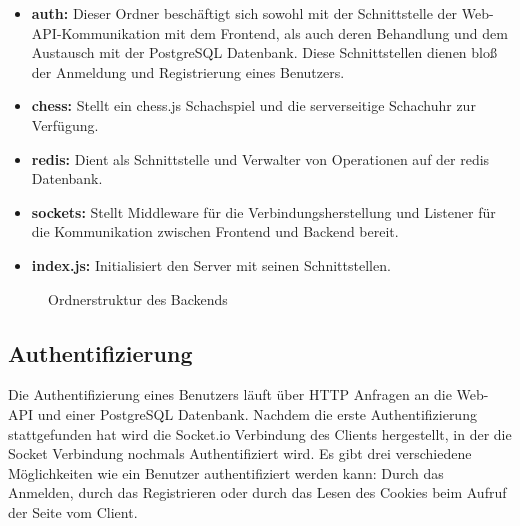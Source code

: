 \begin{itemize}
\item \textbf{auth:} Dieser Ordner beschäftigt sich sowohl mit der Schnittstelle der Web-API-Kommunikation mit dem Frontend, als auch deren Behandlung und dem Austausch mit der PostgreSQL Datenbank. Diese Schnittstellen dienen bloß der Anmeldung und Registrierung eines Benutzers.
\item \textbf{chess:} Stellt ein chess.js Schachspiel und die serverseitige Schachuhr zur Verfügung.
\item \textbf{redis:} Dient als Schnittstelle und Verwalter von Operationen auf der redis Datenbank.
\item \textbf{sockets:} Stellt Middleware für die Verbindungsherstellung und Listener für die Kommunikation zwischen Frontend und Backend bereit.
\item \textbf{index.js:} Initialisiert den Server mit seinen Schnittstellen.
\end{itemize}

\begin{figure}[h]
\centering

\begin{minipage}{0.5\textwidth}
\end{minipage}
\caption{Ordnerstruktur des Backends}
\label{fig:backend_dirtree}

\end{figure}


\subsection{Authentifizierung}
\label{sec:Authentifizierung Backend}
Die Authentifizierung eines Benutzers läuft über HTTP Anfragen an die Web-API und einer PostgreSQL Datenbank.
Nachdem die erste Authentifizierung stattgefunden hat wird die Socket.io Verbindung des Clients hergestellt, in der die Socket Verbindung nochmals Authentifiziert wird.
Es gibt drei verschiedene Möglichkeiten wie ein Benutzer authentifiziert werden kann: Durch das Anmelden, durch das Registrieren oder durch das Lesen des Cookies beim Aufruf der Seite vom Client.


